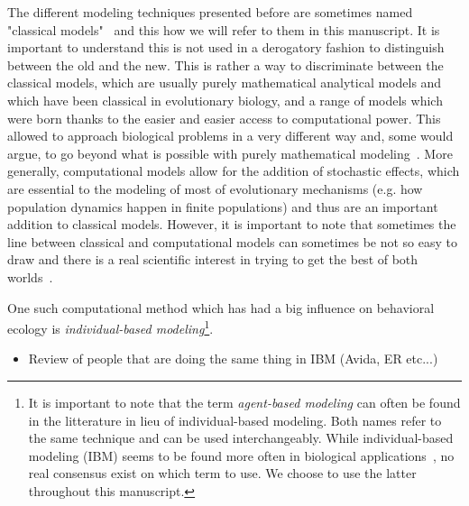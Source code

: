     The different modeling techniques presented before are sometimes named "classical models"~\cite{Huston1988, Adami2014} and this how we will refer to them in this manuscript. It is important to understand this is not used in a derogatory fashion to distinguish between the old and the new. This is rather a way to discriminate between the classical models, which are usually purely mathematical analytical models and which have been classical in evolutionary biology, and a range of models which were born thanks to the easier and easier access to computational power. This allowed to approach biological problems in a very different way and, some would argue, to go beyond what is possible with purely mathematical modeling~\cite{Adami2012}. More generally, computational models allow for the addition of stochastic effects, which are essential to the modeling of most of evolutionary mechanisms (e.g. how population dynamics happen in finite populations) and thus are an important addition to classical models. However, it is important to note that sometimes the line between classical and computational models can sometimes be not so easy to draw and there is a real scientific interest in trying to get the best of both worlds~\cite{Wilson1998}.

    One such computational method which has had a big influence on behavioral ecology is \emph{individual-based modeling}\footnote{It is important to note that the term \emph{agent-based modeling} can often be found in the litterature in lieu of individual-based modeling. Both names refer to the same technique and can be used interchangeably. While individual-based modeling (IBM) seems to be found more often in biological applications~\cite{Grimm2005}, no real consensus exist on which term to use. We choose to use the latter throughout this manuscript.}.


    \begin{itemize}
      \item{Review of people that are doing the same thing in IBM (Avida, ER etc...)}
    \end{itemize}







































